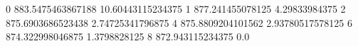 0 883.5475463867188 10.60443115234375
1 877.241455078125 4.29833984375
2 875.6903686523438 2.74725341796875
4 875.8809204101562 2.93780517578125
6 874.322998046875 1.3798828125
8 872.943115234375 0.0
